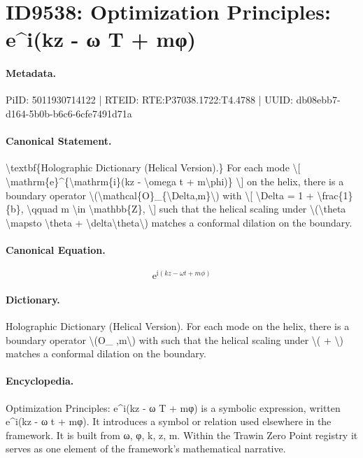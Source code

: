 \section*{ID9538: Optimization Principles: e\textasciicircum{}i(kz - ω T + mφ)}
\paragraph{Metadata.}
PiID: 5011930714122 | RTEID: RTE:P37038.1722:T4.4788 | UUID: db08ebb7-d164-5b0b-b6c6-6cfe7491d71a

\paragraph{Canonical Statement.}
\textbackslash{}textbf\{Holographic Dictionary (Helical Version).\} For each mode \textbackslash{}[ \textbackslash{}mathrm\{e\}\textasciicircum{}\{\textbackslash{}mathrm\{i\}(kz - \textbackslash{}omega t + m\textbackslash{}phi)\} \textbackslash{}] on the helix, there is a boundary operator \textbackslash{}(\textbackslash{}mathcal\{O\}\_\{\textbackslash{}Delta,m\}\textbackslash{}) with \textbackslash{}[ \textbackslash{}Delta = 1 + \textbackslash{}frac\{1\}\{b\}, \textbackslash{}qquad m \textbackslash{}in \textbackslash{}mathbb\{Z\}, \textbackslash{}] such that the helical scaling under \textbackslash{}(\textbackslash{}theta \textbackslash{}mapsto \textbackslash{}theta + \textbackslash{}delta\textbackslash{}theta\textbackslash{}) matches a conformal dilation on the boundary.

\paragraph{Canonical Equation.}
\[
\mathrm{e}^{\mathrm{i}(kz - \omega t + m\phi)}
\]

\paragraph{Dictionary.}
Holographic Dictionary (Helical Version). For each mode on the helix, there is a boundary operator \textbackslash{}(O\_ ,m\textbackslash{}) with such that the helical scaling under \textbackslash{}( + \textbackslash{}) matches a conformal dilation on the boundary.

\paragraph{Encyclopedia.}
Optimization Principles: e\textasciicircum{}i(kz - ω T + mφ) is a symbolic expression, written e\textasciicircum{}i(kz - ω t + mφ). It introduces a symbol or relation used elsewhere in the framework. It is built from ω, φ, k, z, m. Within the Trawin Zero Point registry it serves as one element of the framework's mathematical narrative.
